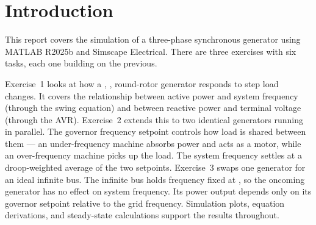 \section{Introduction}

This report covers the simulation of a three-phase synchronous generator using
MATLAB R2025b and Simscape Electrical. There are three exercises with six
tasks, each one building on the previous.

Exercise~1 looks at how a , ,  round-rotor generator
responds to step load changes. It covers the relationship between active power
and system frequency (through the swing equation) and between reactive power
and terminal voltage (through the AVR). Exercise~2 extends this to two
identical generators running in parallel. The governor frequency setpoint
controls how load is shared between them --- an under-frequency machine absorbs
power and acts as a motor, while an over-frequency machine picks up the load.
The system frequency settles at a droop-weighted average of the two setpoints.
Exercise~3 swaps one generator for an ideal infinite bus. The infinite bus
holds frequency fixed at , so the oncoming generator has no effect on
system frequency. Its power output depends only on its governor setpoint
relative to the grid frequency. Simulation plots, equation derivations, and
steady-state calculations support the results throughout.
